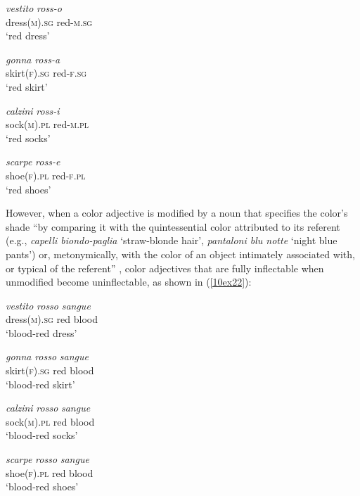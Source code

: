 \documentclass[output=paper,colorlinks,citecolor=brown]{langscibook}
\begin{document}
\begin{exe}
	\ex \label{10ex21}
	\begin{xlist}
		\ex 
		\gll \emph{vestito} \emph{ross-o} \\
		dress(\textsc{m}).\textsc{sg} red-\textsc{m.sg} \\
		\trans ‘red dress’
		
		\ex 
		\gll \emph{gonna} \emph{ross-a} \\
		skirt(\textsc{f}).\textsc{sg} red-\textsc{f.sg} \\
		\trans ‘red skirt’
		
		\ex 
		\gll \emph{calzini} \emph{ross-i} \\
		sock(\textsc{m}).\textsc{pl} red-\textsc{m.pl} \\
		\trans ‘red socks’
		
		\ex 
		\gll \emph{scarpe} \emph{ross-e} \\
		shoe(\textsc{f}).\textsc{pl} red-\textsc{f.pl} \\
		\trans ‘red shoes’
	\end{xlist}
\end{exe}

However, when a color adjective is modified by a noun that specifies the color's shade ``by comparing it with the quintessential color attributed to its referent (e.g., \emph{capelli biondo-paglia} `straw-blonde hair', \emph{pantaloni blu notte} `night blue pants') or, metonymically, with the color of an object intimately associated with, or typical of the referent'' \citep[71]{grossmanndachille2019}, color adjectives that are fully inflectable when unmodified become uninflectable, as shown in (\ref{10ex22}):

\begin{exe}
	\ex \label{10ex22}
	\begin{xlist}
		\ex 
		\gll \emph{vestito} \emph{rosso} \emph{sangue} \\
		dress(\textsc{m}).\textsc{sg} red\footnotemark \phantom{x} blood \\
		\trans ‘blood-red dress’
		
		\ex 
		\gll \emph{gonna} \emph{rosso} \emph{sangue} \\
		skirt(\textsc{f}).\textsc{sg} red blood \\
		\trans ‘blood-red skirt’
		
		\ex 
		\gll \emph{calzini} \emph{rosso} \emph{sangue} \\
		sock(\textsc{m}).\textsc{pl} red blood \\
		\trans ‘blood-red socks’
		
		\ex 
		\gll \emph{scarpe} \emph{rosso} \emph{sangue} \\
		shoe(\textsc{f}).\textsc{pl} red blood \\
		\trans ‘blood-red shoes’
	\end{xlist}
\end{exe}
\end{document}
